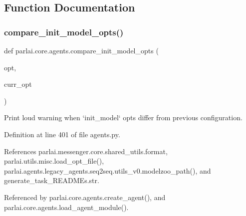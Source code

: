 \subsection{Function Documentation}
\mbox{\label{namespaceparlai_1_1core_1_1agents_a7eb0ec391b94a2adc51acdf8d2a35a68}} 
\subsubsection{\texorpdfstring{compare\+\_\+init\+\_\+model\+\_\+opts()}{compare\_init\_model\_opts()}}
{\footnotesize\ttfamily def parlai.\+core.\+agents.\+compare\+\_\+init\+\_\+model\+\_\+opts (\begin{DoxyParamCaption}\item[{}]{opt,  }\item[{}]{curr\+\_\+opt }\end{DoxyParamCaption})}

\begin{DoxyVerb}Print loud warning when `init_model` opts differ from previous configuration.\end{DoxyVerb}
 

Definition at line 401 of file agents.\+py.



References parlai.\+messenger.\+core.\+shared\+\_\+utils.\+format, parlai.\+utils.\+misc.\+load\+\_\+opt\+\_\+file(), parlai.\+agents.\+legacy\+\_\+agents.\+seq2seq.\+utils\+\_\+v0.\+modelzoo\+\_\+path(), and generate\+\_\+task\+\_\+\+R\+E\+A\+D\+M\+Es.\+str.



Referenced by parlai.\+core.\+agents.\+create\+\_\+agent(), and parlai.\+core.\+agents.\+load\+\_\+agent\+\_\+module().

